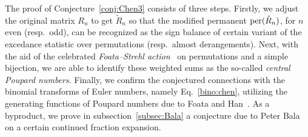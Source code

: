 \documentclass[11pt,reqno]{amsart}
\numberwithin{equation}{section}
\theoremstyle{plain}
\theoremstyle{definition}
\def\per{\mathrm{per}}
\def\per{{\rm per}}
\begin{document}
The proof of Conjecture~\ref{conj:Chen3} consists of three steps. Firstly, we adjust the original matrix $R_n$ to get $\tilde{R}_n$ so that the modified permanent $\per(\tilde{R}_n)$, for $n$ even (resp.~odd), can be recognized as the sign balance of certain variant of the excedance statistic over permutations (resp.~almost derangements). Next, with the aid of  the celebrated {\em Foata--Strehl action}~\cite{FSt} on permutations and a simple bijection, we are able to identify these weighted sums as the so-called {\it central Poupard numbers}. Finally, we confirm the conjectured connections with the binomial transforms of Euler numbers, namely Eq.~\eqref{bino:chen}, utilizing the generating functions of Poupard numbers due to Foata and Han~\cite{FH}. As a byproduct, we prove in subsection~\ref{subsec:Bala} a conjecture due to Peter Bala on a certain continued fraction expansion.
\end{document}
